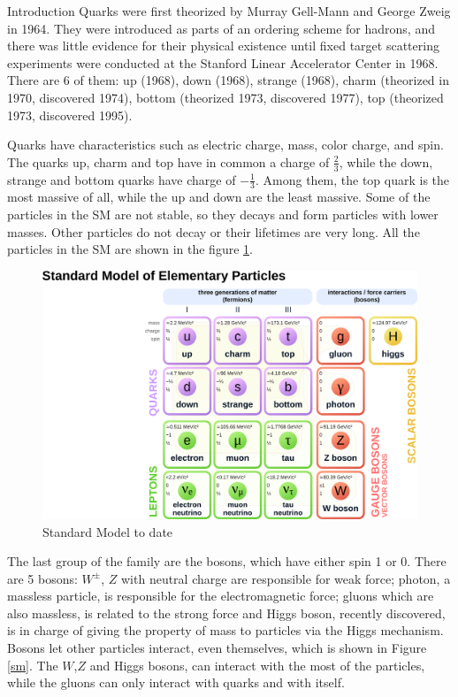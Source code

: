 \begin{chapter}{Introduction}
Quarks were first theorized by Murray Gell-Mann and 
George Zweig in 1964. They were introduced as parts of an ordering scheme for hadrons, and there was little evidence for their physical existence until fixed target scattering experiments were conducted at the Stanford Linear Accelerator Center in 1968\cite{griff}.
There are 6 of them: up (1968), down (1968), strange (1968), charm (theorized in 1970, discovered 1974), bottom (theorized 1973, discovered 1977), top (theorized 1973, discovered 1995).

Quarks have characteristics such as electric charge, mass, color charge, and spin. The quarks up, charm and top have in common a charge of $\frac{2}{3}$, while the down, strange and bottom quarks have charge of $-\frac{1}{3}$. Among them, the top quark is the most massive of all, while the up and down are the least massive. 
Some of the particles in the SM are not stable, so they decays and form particles with lower masses. Other particles do not decay or their lifetimes are very long. All the particles in the SM are shown in the figure \ref{sm1}. %

\begin{center}
  \begin{figure}[ht]
    \centering
    \includegraphics[scale=0.3]{Chapter1/sm1.png}
    \caption[Standard Model to date]{Standard Model to date\cite{smtable}}
    \label{sm1}
  \end{figure}
\end{center}
The last group of the family are the bosons, which have either spin 1 or 0. 
There are 5 bosons: $W^{\pm}$, $Z$ with neutral charge are responsible for weak force; photon, a massless particle, is responsible for the electromagnetic force; gluons which are also massless, is related to the strong force and Higgs boson, recently discovered, is in charge of giving the property of mass to particles via the Higgs mechanism. Bosons let other particles interact, even themselves, which is shown in Figure \ref{sm}. 
The $W$,$Z$ and Higgs bosons, can interact with the most of the particles, while the gluons can only interact with quarks and with itself.


\end{chapter}

